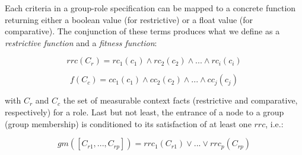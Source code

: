 Each criteria in a group-role specification can be mapped to a concrete function returning either a boolean value (for restrictive) or a float value (for comparative). The conjunction of these terms produces what we define as a \textit{restrictive function} and a \textit{fitness function}:

\begin{equation}\label{eq:rrc}
rrc(C_r) = rc_1(c_1) \wedge rc_2(c_2) \wedge ... \wedge rc_i(c_i)
\end{equation}

\begin{equation}\label{eq:fitness}
f(C_c) = cc_1(c_1) \wedge cc_2(c_2) \wedge ... \wedge cc_j(c_j)
\end{equation}

\noindent
with $C_r$ and $C_c$ the set of measurable context facts (restrictive and comparative, respectively) for a role. Last but not least, the entrance of a node to a group (group membership) is conditioned to its satisfaction of at least one $rrc$, i.e.:

\begin{equation}\label{eq:membership}
gm([C_{r1},...,C_{rp}]) = rrc_1(C_{r1}) \vee ... \vee rrc_p(C_{rp})
\end{equation}


